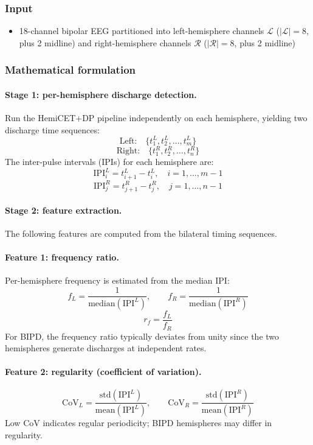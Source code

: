 \subsubsection{Input}

\begin{itemize}
  \item 18-channel bipolar EEG partitioned into left-hemisphere channels $\mathcal{L}$ ($|\mathcal{L}| = 8$, plus 2 midline) and right-hemisphere channels $\mathcal{R}$ ($|\mathcal{R}| = 8$, plus 2 midline)
\end{itemize}

\subsubsection{Mathematical formulation}

\paragraph{Stage 1: per-hemisphere discharge detection.}
Run the HemiCET+DP pipeline independently on each hemisphere, yielding two discharge time sequences:
\[ \text{Left:}\quad \{t_1^L, t_2^L, \ldots, t_m^L\} \tag{1} \]
\[ \text{Right:}\quad \{t_1^R, t_2^R, \ldots, t_n^R\} \tag{2} \]
The inter-pulse intervals (IPIs) for each hemisphere are:
\[ \mathrm{IPI}_i^L = t_{i+1}^L - t_i^L, \quad i = 1,\ldots,m-1 \tag{3} \]
\[ \mathrm{IPI}_j^R = t_{j+1}^R - t_j^R, \quad j = 1,\ldots,n-1 \tag{4} \]

\paragraph{Stage 2: feature extraction.}
The following features are computed from the bilateral timing sequences.

\paragraph{Feature 1: frequency ratio.}
Per-hemisphere frequency is estimated from the median IPI:
\[ f_L = \frac{1}{\mathrm{median}(\mathrm{IPI}^L)}, \qquad f_R = \frac{1}{\mathrm{median}(\mathrm{IPI}^R)} \tag{5} \]
\[ r_f = \frac{f_L}{f_R} \tag{6} \]
For BIPD, the frequency ratio typically deviates from unity since the two hemispheres generate discharges at independent rates.

\paragraph{Feature 2: regularity (coefficient of variation).}
\[ \mathrm{CoV}_L = \frac{\mathrm{std}(\mathrm{IPI}^L)}{\mathrm{mean}(\mathrm{IPI}^L)}, \qquad \mathrm{CoV}_R = \frac{\mathrm{std}(\mathrm{IPI}^R)}{\mathrm{mean}(\mathrm{IPI}^R)} \tag{7} \]
Low CoV indicates regular periodicity; BIPD hemispheres may differ in regularity.

